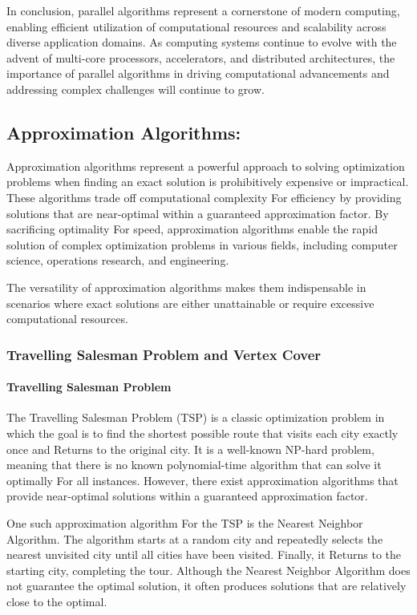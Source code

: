 \documentclass[12pt]{book} %
\begin{document}
In conclusion, parallel algorithms represent a cornerstone of modern computing, enabling efficient utilization of computational resources and scalability across diverse application domains. As computing systems continue to evolve with the advent of multi-core processors, accelerators, and distributed architectures, the importance of parallel algorithms in driving computational advancements and addressing complex challenges will continue to grow.


\subsection{Approximation Algorithms:}

Approximation algorithms represent a powerful approach to solving optimization problems when finding an exact solution is prohibitively expensive or impractical. These algorithms trade off computational complexity For efficiency by providing solutions that are near-optimal within a guaranteed approximation factor. By sacrificing optimality For speed, approximation algorithms enable the rapid solution of complex optimization problems in various fields, including computer science, operations research, and engineering.

The versatility of approximation algorithms makes them indispensable in scenarios where exact solutions are either unattainable or require excessive computational resources.

\subsubsection{Travelling Salesman Problem and Vertex Cover}
\paragraph{Travelling Salesman Problem}
The Travelling Salesman Problem (TSP) is a classic optimization problem in which the goal is to find the shortest possible route that visits each city exactly once and Returns to the original city. It is a well-known NP-hard problem, meaning that there is no known polynomial-time algorithm that can solve it optimally For all instances. However, there exist approximation algorithms that provide near-optimal solutions within a guaranteed approximation factor.

One such approximation algorithm For the TSP is the Nearest Neighbor Algorithm. The algorithm starts at a random city and repeatedly selects the nearest unvisited city until all cities have been visited. Finally, it Returns to the starting city, completing the tour. Although the Nearest Neighbor Algorithm does not guarantee the optimal solution, it often produces solutions that are relatively close to the optimal.
\end{document}
